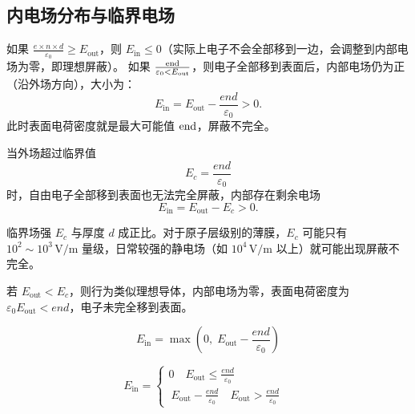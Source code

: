 \documentclass{article}
\begin{document}
\subsection{内电场分布与临界电场}

如果 $ \frac{e \times n \times d} {\varepsilon_0} \ge E_\text{out} $，则 $ E_\text{in} \le 0 $（实际上电子不会全部移到一边，会调整到内部电场为零，即理想屏蔽）。
如果 $ \frac{\rm{e n d}}{ \varepsilon_0 < E_\text{out}} $，则电子全部移到表面后，内部电场仍为正（沿外场方向），大小为：
$$E_\text{in} = E_\text{out} - \frac{e n d}{\varepsilon_0} > 0.$$
此时表面电荷密度就是最大可能值 $ \rm{e n d} $，屏蔽不完全。

当外场超过临界值  
   $$E_c = \frac{e n d}{\varepsilon_0}$$
   时，自由电子全部移到表面也无法完全屏蔽，内部存在剩余电场  
   $$E_\text{in} = E_\text{out} - E_c > 0.$$

   临界场强 $ E_c $ 与厚度 $ d $ 成正比。对于原子层级别的薄膜，$ E_c $ 可能只有 $ 10^2 \sim 10^3 \,\text{V/m} $ 量级，日常较强的静电场（如 $ 10^4 \,\text{V/m} $ 以上）就可能出现屏蔽不完全。

若 $ E_\text{out} < E_c $，则行为类似理想导体，内部电场为零，表面电荷密度为 $ \varepsilon_0 E_\text{out} < e n d $，电子未完全移到表面。



$$E_\text{in} = \max\left(0, \; E_\text{out} - \frac{e n d}{\varepsilon_0} \right)$$

$$E_\text{in}=\begin{cases}0\quad E_\text{out} \leq \frac{e n d}{\varepsilon_0} \\\ E_\text{out} - \frac{e n d}{\varepsilon_0}\quad E_\text{out} > \frac{e n d}{\varepsilon_0}&\end{cases}$$
\end{document}
